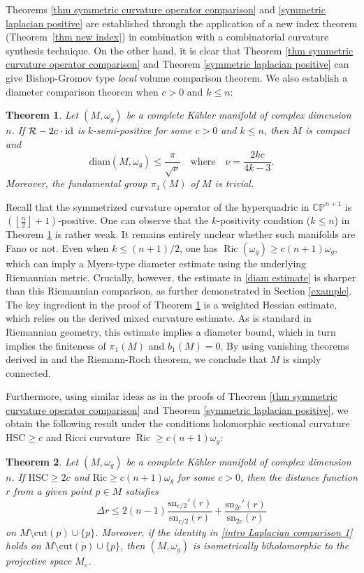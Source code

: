 \documentclass[12pt,reqno]{amsart}
\newcommand\sR{{\mathcal R}}
\newcommand{\id}{{\rm id}}
\theoremstyle{plain}
\newtheorem{thm}{Theorem}[section]
\theoremstyle{definition}
\newcommand{\btheorem}{\begin{thm}}
\newcommand{\etheorem}{\end{thm}}
\newcommand{\beq}{\begin{equation}}
\newcommand{\eeq}{\end{equation}}
\newcommand{\qtq}[1]{\quad\mbox{#1}\quad}
\renewcommand{\>}{\rightarrow}
\numberwithin{equation}{section} %
\newcommand{\om}{\omega}
\renewcommand{\leq}{\leqslant}
\renewcommand{\geq}{\geqslant}
\newcommand{\vone}{\vskip 1\baselineskip}
\newcommand{\Ric}{\operatorname{Ric}}
\begin{document}
\noindent Theorems \ref{thm symmetric curvature operator comparison} and \ref{symmetric laplacian positive} are established through the application of a new index theorem (Theorem~\ref{thm new index}) in combination with a combinatorial curvature synthesis technique. On the other
hand, it is clear that Theorem \ref{thm symmetric curvature operator
comparison} and Theorem \ref{symmetric laplacian positive} can give
Bishop-Gromov type \emph{local} volume comparison theorem. We also
establish a diameter comparison theorem when $c>0$ and $k\leq n$:
\btheorem\label{thm diam} Let $(M, \omega_g)$ be a complete K\"ahler
manifold of complex dimension $n$. If $\sR-2c\cdot\id$ is
$k$-semi-positive for some $c>0$ and $k\leq n$, then $M$ is compact
and \beq \mathrm{diam}(M,\om_g)\leq
\frac{\pi}{\sqrt{\nu}}\qtq{where}\nu=\frac{2kc}{4k-3}.\label{diam
estimate} \eeq Moreover, the fundamental group $\pi_1(M)$ of $M$ is
trivial. \etheorem 




\noindent  Recall that the symmetrized curvature operator of the hyperquadric in $\mathbb{C}\mathbb{P}^{n+1}$ is $\left(\left\lfloor \frac{n}{2}\right\rfloor+1\right)$-positive. One can observe that the $k$-positivity condition ($k \leq n$) in Theorem \ref{thm diam} is rather weak. It remains entirely unclear whether such manifolds are Fano or not. Even when $k \leq (n+1)/2$, one has $\Ric(\omega_g)\geq c(n+1)\omega_g$, which can imply a Myers-type diameter estimate using the underlying Riemannian metric. Crucially, however, the estimate in \eqref{diam estimate} is sharper than this Riemannian comparison, as further demonstrated in Section \ref{example}. The key ingredient in the proof of Theorem
\ref{thm diam} is a weighted Hessian estimate, which relies on the
derived mixed curvature estimate. As is standard in Riemannian
geometry, this estimate implies a diameter bound, which in turn
implies the finiteness of $\pi_1(M)$ and $b_1(M) = 0$.  By using
vanishing theorems derived in \cite{WY25+} and the Riemann-Roch
theorem, we conclude that $M$ is simply connected.

\vone
Furthermore,  using similar ideas as in the proofs of Theorem \ref{thm symmetric curvature operator comparison} and Theorem \ref{symmetric laplacian positive}, we obtain the following result under the conditions holomorphic sectional curvature $\mathrm{HSC} \geq c$ and Ricci curvature $\Ric \geq c(n+1)\omega_g$:


\btheorem \label{thm Laplacian Ric and HSC}
Let $(M, \omega_g)$ be a complete K\"ahler manifold of complex dimension $n$.
If $\mathrm{HSC}\geq 2c$ and $\mathrm{Ric}\geq c(n+1)\om_g$ for some $c>0$, then the distance function $r$ from a  given point $p\in M$  satisfies
\beq
\Delta r\leq 2(n-1)\frac{\mathrm{sn}_{c/2}'(r)}{\mathrm{sn}_{c/2}(r)}+\frac{\mathrm{sn}_{2c}'(r)}{\mathrm{sn}_{2c}(r)} \label{intro Laplacian comparison 1}
\eeq
on $M\setminus\mathrm{cut}(p)\cup \{p\}$. Moreover, if the identity in \eqref{intro Laplacian comparison 1} holds on $M\setminus\mathrm{cut}(p)\cup \{p\}$,
then $(M,\omega_g)$ is isometrically biholomorphic to the projective space $M_c$.
\etheorem
\end{document}
